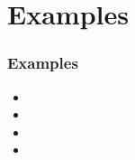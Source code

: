 \documentclass[fleqn]{beamer} %
\newcommand{\sectiontitleIV}{Examples}
\begin{document}
\section{\sectiontitleIV}	
	    \begin{frame}[label=sectionIV] \small
		\frametitle{\sectiontitleIV}    
  
  			\begin{itemize}
	            \item 
	            \item 
	            \item 
	            \item 
	        \end{itemize}

		\end{frame}
		
\end{document}
